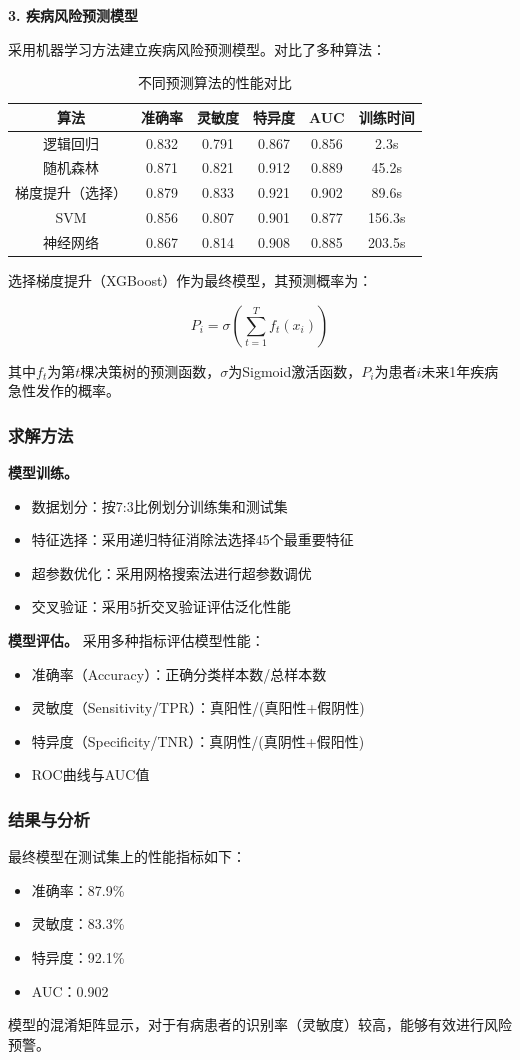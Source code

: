 \textbf{3. 疾病风险预测模型}

采用机器学习方法建立疾病风险预测模型。对比了多种算法：

\begin{table}[H]
  \centering
  \caption{不同预测算法的性能对比}
  \label{tab:algorithm_comparison}
  \begin{tabularx}{\textwidth}{CCCCCC}
    \toprule
    算法 & 准确率 & 灵敏度 & 特异度 & AUC & 训练时间 \\
    \midrule
    逻辑回归 & 0.832 & 0.791 & 0.867 & 0.856 & 2.3s \\
    随机森林 & 0.871 & 0.821 & 0.912 & 0.889 & 45.2s \\
    梯度提升（选择） & 0.879 & 0.833 & 0.921 & 0.902 & 89.6s \\
    SVM & 0.856 & 0.807 & 0.901 & 0.877 & 156.3s \\
    神经网络 & 0.867 & 0.814 & 0.908 & 0.885 & 203.5s \\
    \bottomrule
  \end{tabularx}
\end{table}

选择梯度提升（XGBoost）作为最终模型，其预测概率为：

$$P_i = \sigma\left(\sum_{t=1}^{T} f_t(x_i)\right)$$

其中$f_t$为第$t$棵决策树的预测函数，$\sigma$为Sigmoid激活函数，$P_i$为患者$i$未来1年疾病急性发作的概率。

\subsubsection{求解方法}

\textbf{模型训练。} 
\begin{itemize}[itemindent=2em]
\item 数据划分：按7:3比例划分训练集和测试集
\item 特征选择：采用递归特征消除法选择45个最重要特征
\item 超参数优化：采用网格搜索法进行超参数调优
\item 交叉验证：采用5折交叉验证评估泛化性能
\end{itemize}

\textbf{模型评估。} 采用多种指标评估模型性能：
\begin{itemize}[itemindent=2em]
\item 准确率（Accuracy）：正确分类样本数/总样本数
\item 灵敏度（Sensitivity/TPR）：真阳性/(真阳性+假阴性)
\item 特异度（Specificity/TNR）：真阴性/(真阴性+假阳性)
\item ROC曲线与AUC值
\end{itemize}

\subsubsection{结果与分析}

最终模型在测试集上的性能指标如下：
\begin{itemize}[itemindent=2em]
\item 准确率：87.9\%
\item 灵敏度：83.3\%
\item 特异度：92.1\%
\item AUC：0.902
\end{itemize}

模型的混淆矩阵显示，对于有病患者的识别率（灵敏度）较高，能够有效进行风险预警。

